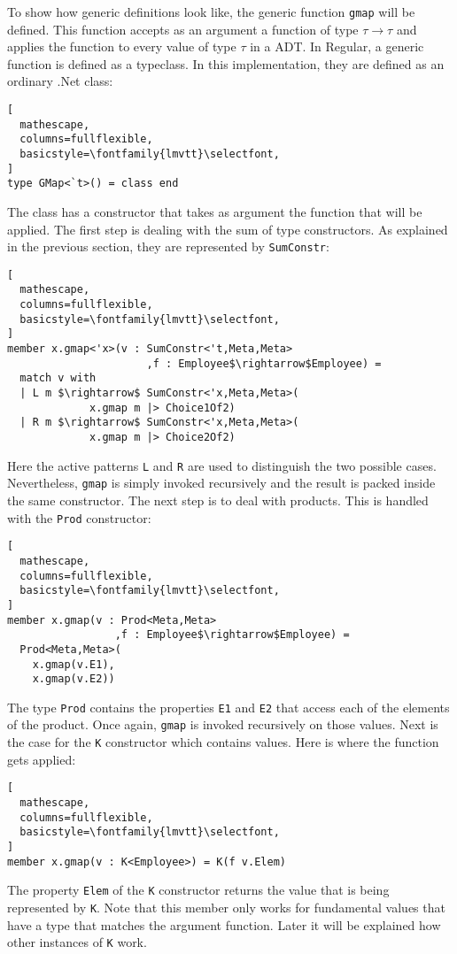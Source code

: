 \documentclass{sigplanconf}
\begin{document}
To show how generic definitions look like, the generic function
\verb+gmap+ will be defined. This function accepts as an argument a
function of type $\tau\to\tau$ and applies the function to every value
of type $\tau$ in a ADT. In Regular, a generic function is defined as
a typeclass. In this implementation, they are defined as an ordinary
.Net class:
\begin{lstlisting}[
  mathescape,
  columns=fullflexible,
  basicstyle=\fontfamily{lmvtt}\selectfont,
]
type GMap<`t>() = class end
\end{lstlisting}
The class has a constructor that takes as argument the function that
will be applied. The first step is dealing with the sum of type
constructors. As explained in the previous section, they are
represented by \verb+SumConstr+:
\begin{lstlisting}[
  mathescape,
  columns=fullflexible,
  basicstyle=\fontfamily{lmvtt}\selectfont,
]
member x.gmap<'x>(v : SumConstr<'t,Meta,Meta>
                      ,f : Employee$\rightarrow$Employee) =
  match v with
  | L m $\rightarrow$ SumConstr<'x,Meta,Meta>(
             x.gmap m |> Choice1Of2)
  | R m $\rightarrow$ SumConstr<'x,Meta,Meta>(
             x.gmap m |> Choice2Of2)
\end{lstlisting}
Here the active patterns \verb+L+ and \verb+R+ are used to distinguish
the two possible cases. Nevertheless, \verb+gmap+ is simply invoked
recursively and the result is packed inside the same constructor. The
next step is to deal with products. This is handled with the
\verb+Prod+ constructor:
\begin{lstlisting}[
  mathescape,
  columns=fullflexible,
  basicstyle=\fontfamily{lmvtt}\selectfont,
]
member x.gmap(v : Prod<Meta,Meta>
                 ,f : Employee$\rightarrow$Employee) =
  Prod<Meta,Meta>(
    x.gmap(v.E1),
    x.gmap(v.E2))
\end{lstlisting}
The type \verb+Prod+ contains the properties \verb+E1+ and \verb+E2+
that access each of the elements of the product. Once again,
\verb+gmap+ is invoked recursively on those values. Next is the case
for the \verb+K+ constructor which contains values. Here is where the
function gets applied:
\begin{lstlisting}[
  mathescape,
  columns=fullflexible,
  basicstyle=\fontfamily{lmvtt}\selectfont,
]
member x.gmap(v : K<Employee>) = K(f v.Elem)
\end{lstlisting}
The property \verb+Elem+ of the \verb+K+ constructor returns the value
that is being represented by \verb+K+. Note that this member only
works for fundamental values that have a type that matches the
argument function. Later it will be explained how other instances of
\verb+K+ work.
\end{document}
